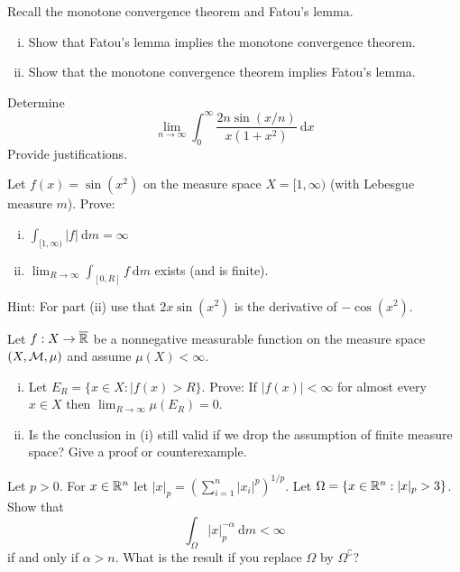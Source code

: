 \begin{problem}
  Recall the monotone convergence theorem and Fatou's lemma.
  \begin{enumerate}[(i)]
    \item Show that Fatou's lemma implies the monotone convergence theorem.
    \item Show that the monotone convergence theorem implies Fatou's lemma.
  \end{enumerate}
\end{problem}

\begin{problem}
  Determine
  \[\lim_{n\to\infty} \int_0^\infty\frac{2n \sin(x/n)}{x(1+x^2)}\ \mathrm{d}x\]
  Provide justifications.
\end{problem}

\begin{problem}
  Let $f(x) = \sin(x^2)$ on the measure space $X = [1, \infty)$ (with Lebesgue measure $m$). Prove:
  \begin{enumerate}[(i)]
    \item $\int_{[1, \infty)} |f| \ \mathrm{d}m = \infty$
    \item $\lim_{R \to \infty}\int_{[0, R]} f\ \mathrm{d}m$ exists (and is finite).
  \end{enumerate}
  Hint: For part (ii) use that $2x\sin(x^2)$ is the derivative of $-\cos(x^2)$.
\end{problem}

\begin{problem}
  Let $f : X \to \overline{\mathbb R}$ be a nonnegative measurable function on the measure space $(X, \mathcal M, \mu)$
  and assume $\mu(X) < \infty$.
  \begin{enumerate}[(i)]
    \item Let $E_R = \{x \in X : |f(x) > R\}$. Prove: If $|f(x)| < \infty$ for almost every $x \in X$ then 
    $\lim_{R \to \infty}\mu(E_R) = 0$.
    \item Is the conclusion in (i) still valid if we drop the assumption of finite measure space?
    Give a proof or counterexample.
  \end{enumerate}
\end{problem}

\begin{problem}
  Let $p > 0$. For $x \in \mathbb R^n$ let $|x|_p = (\sum_{i=1}^n |x_i|^p)^{1/p}$. Let $\Omega = \{x \in \mathbb R^n : |x|_p > 3\}$.
  Show that 
  \[\int_{\Omega} |x|_p^{-\alpha}\ \mathrm{d}m < \infty\]
  if and only if $\alpha > n$. What is the result if you replace $\Omega$ by $\Omega^\complement$?
\end{problem}